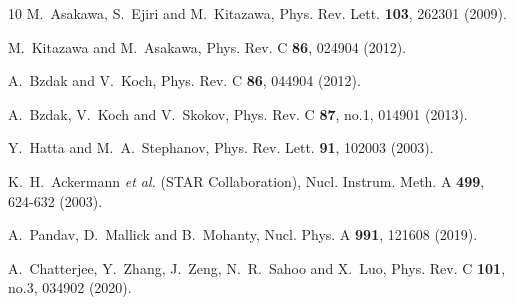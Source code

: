 \documentclass[10pt,aps,prc,twocolumn,floatfix]{revtex4-1}
\begin{document}
\begin{thebibliography}{10}
M.~Asakawa, S.~Ejiri and M.~Kitazawa,
Phys. Rev. Lett. \textbf{103}, 262301 (2009).

M.~Kitazawa and M.~Asakawa,
Phys. Rev. C \textbf{86}, 024904 (2012).

A.~Bzdak and V.~Koch,
Phys. Rev. C \textbf{86}, 044904 (2012).

A.~Bzdak, V.~Koch and V.~Skokov,
Phys. Rev. C \textbf{87}, no.1, 014901 (2013).

Y.~Hatta and M.~A.~Stephanov,
Phys. Rev. Lett. \textbf{91}, 102003 (2003).


K.~H.~Ackermann \textit{et al.} (STAR Collaboration), 
Nucl. Instrum. Meth. A \textbf{499}, 624-632 (2003).


A.~Pandav, D.~Mallick and B.~Mohanty,
Nucl. Phys. A \textbf{991}, 121608 (2019).

A.~Chatterjee, Y.~Zhang, J.~Zeng, N.~R.~Sahoo and X.~Luo,
Phys. Rev. C \textbf{101}, no.3, 034902 (2020).


\end{thebibliography}
\end{document}
